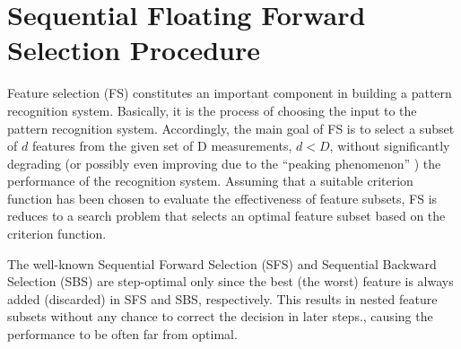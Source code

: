 \chapter{Sequential Floating Forward Selection Procedure} \label{apx_SFFS}
Feature selection (FS) constitutes an important component in
building a pattern recognition system. Basically, it is the process
of choosing the input to the pattern recognition system.
Accordingly, the main goal of FS is to select a subset of $d$
features from the given set of D measurements, $d < D$, without
significantly degrading (or possibly even improving due to the
``peaking phenomenon'' \cite{Duda02}) the performance of the
recognition system. Assuming that a suitable criterion function has
been chosen to evaluate the effectiveness of feature subsets, FS is
reduces to a search problem that selects an optimal feature subset
based on the criterion function.

The well-known Sequential Forward Selection (SFS) and Sequential
Backward Selection (SBS) are step-optimal only since the best (the
worst) feature is always added (discarded) in SFS and SBS,
respectively. This results in nested feature subsets without any
chance to correct the decision in later steps., causing the
performance to be often far from optimal.

